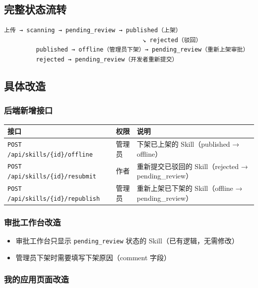 \documentclass[11pt,a4paper]{article}
\begin{document}
\subsection{完整状态流转}

\begin{verbatim}
上传 → scanning → pending_review → published（上架）
                                       ↘ rejected（驳回）
         published → offline（管理员下架）→ pending_review（重新上架审批）
         rejected → pending_review（开发者重新提交）
\end{verbatim}

\subsection{具体改造}

\subsubsection{后端新增接口}

\begin{table}[h]
\centering
\begin{tabularx}{\linewidth}{llX}
\toprule
\textbf{接口} & \textbf{权限} & \textbf{说明} \\
\midrule
\texttt{POST /api/skills/\{id\}/offline} & 管理员 & 下架已上架的 Skill（published → offline） \\
\texttt{POST /api/skills/\{id\}/resubmit} & 作者 & 重新提交已驳回的 Skill（rejected → pending\_review） \\
\texttt{POST /api/skills/\{id\}/republish} & 管理员 & 重新上架已下架的 Skill（offline → pending\_review） \\
\bottomrule
\end{tabularx}
\end{table}

\subsubsection{审批工作台改造}

\begin{itemize}[nosep]
  \item 审批工作台只显示 \texttt{pending\_review} 状态的 Skill（已有逻辑，无需修改）
  \item 管理员下架时需要填写下架原因（comment 字段）
\end{itemize}

\subsubsection{我的应用页面改造}
\end{document}
